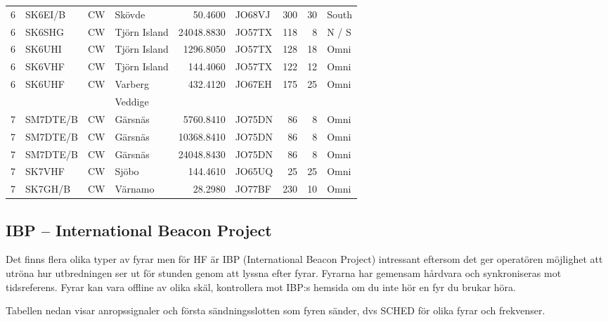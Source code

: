 \begin{longtable}{rlllrlrrl}
	       6 & SK6EI/B    & CW       & Skövde       &      50.4600 & JO68VJ      &      300 &       30 & South        \\
	       6 & SK6SHG     & CW       & Tjörn Island &   24048.8830 & JO57TX      &      118 &        8 & N / S        \\
	       6 & SK6UHI     & CW       & Tjörn Island &    1296.8050 & JO57TX      &      128 &       18 & Omni         \\
	       6 & SK6VHF     & CW       & Tjörn Island &     144.4060 & JO57TX      &      122 &       12 & Omni         \\
	       6 & SK6UHF     & CW       & Varberg      &     432.4120 & JO67EH      &      175 &       25 & Omni         \\
	         &            &          & Veddige      &              &             &          &          &              \\
	       7 & SM7DTE/B   & CW       & Gärsnäs      &    5760.8410 & JO75DN      &       86 &        8 & Omni         \\
	       7 & SM7DTE/B   & CW       & Gärsnäs      &   10368.8410 & JO75DN      &       86 &        8 & Omni         \\
	       7 & SM7DTE/B   & CW       & Gärsnäs      &   24048.8430 & JO75DN      &       86 &        8 & Omni         \\
	       7 & SK7VHF     & CW       & Sjöbo        &     144.4610 & JO65UQ      &       25 &       25 & Omni         \\
	       7 & SK7GH/B    & CW       & Värnamo      &      28.2980 & JO77BF      &      230 &       10 & Omni
\end{longtable}
\normalsize
\clearpage

\subsection{IBP -- International Beacon Project}

Det finns flera olika typer av fyrar men för HF är IBP (International Beacon
Project) intressant eftersom det ger operatören möjlighet att utröna hur
utbredningen ser ut för stunden genom att lyssna efter fyrar. Fyrarna har
gemensam hårdvara och synkroniseras mot tidsreferens. Fyrar kan vara offline
av olika skäl, kontrollera mot IBP:s hemsida om du inte hör en fyr du brukar
höra.

Tabellen nedan visar anropssignaler och första sändningsslotten som fyren
sänder, dvs SCHED för olika fyrar och frekvenser.

